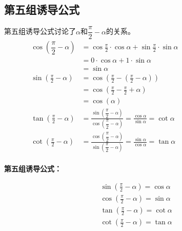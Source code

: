 \documentclass[UTF8]{ctexart}
\begin{document}
\newpage

\subsection{第五组诱导公式}
    第五组诱导公式讨论了$\alpha$和$\dfrac{\pi}{2}-\alpha$的关系。\\
    \setcounter{equation}{0}
    \begin{align}
        \cos{\left(\dfrac{\pi}{2}-\alpha\right)}
        &=\cos{\frac{\pi}{2}}\cdot\cos{\alpha}+\sin{\frac{\pi}{2}}\cdot\sin{\alpha}\qquad\qquad\qquad\qquad\\[3mm]
        &=0\cdot\cos{\alpha}+1\cdot\sin{\alpha}\\[3mm]
        &=\sin{\alpha}\\[6mm]
        \sin{\left(\frac{\pi}{2}-\alpha\right)}
        &=\cos{\left(\frac{\pi}{2}-\left(\frac{\pi}{2}-\alpha\right)\right)}\\[3mm]
        &=\cos{\left(\frac{\pi}{2}-\frac{\pi}{2}+\alpha\right)}\\[3mm]
        &=\cos{(\alpha)}\\[6mm]
        \tan{\left(\frac{\pi}{2}-\alpha\right)}
        &=\frac{\sin{\left(\dfrac{\pi}{2}-\alpha\right)}}{\cos{\left(\dfrac{\pi}{2}-\alpha\right)}}=\frac{\cos{\alpha}}{\sin{\alpha}}=\cot{\alpha}\\[6mm]
        \cot{\left(\frac{\pi}{2}-\alpha\right)}
        &=\frac{\cos{\left(\dfrac{\pi}{2}-\alpha\right)}}{\sin{\left(\dfrac{\pi}{2}-\alpha\right)}}=\frac{\sin{\alpha}}{\cos{\alpha}}=\tan{\alpha}
    \end{align}\\[3mm]
    \textbf{第五组诱导公式：}
    \begin{large}
    \begin{align*}
        &\sin{\left(\frac{\pi}{2}-\alpha\right)}=\cos{\alpha}\\[4mm]
        &\cos{\left(\frac{\pi}{2}-\alpha\right)}=\sin{\alpha}\\[4mm]
        &\tan{\left(\frac{\pi}{2}-\alpha\right)}=\cot{\alpha}\\[4mm]
        &\cot{\left(\frac{\pi}{2}-\alpha\right)}=\tan{\alpha}
    \end{align*}
    \end{large}

\newpage
\end{document}
